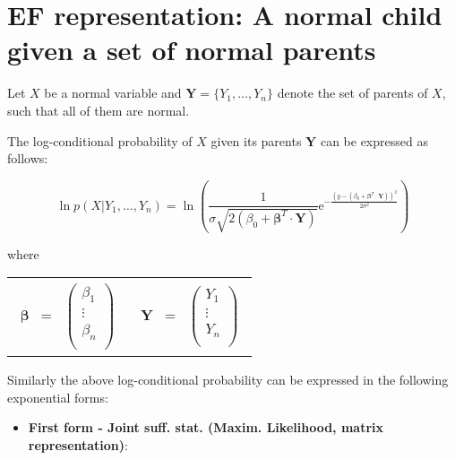 \documentclass[11pt, oneside]{article}   	%
\newcommand{\bm}{\mathbf}
\newcommand{\bs}{\boldsymbol}
\newcommand{\me}{\mathrm{e}}
\numberwithin{figure}{section}
\numberwithin{equation}{section}
\numberwithin{table}{section}
\theoremstyle{definition}
\begin{document}
\begin{appendices}
\begin{itemize}
\end{itemize}


\newpage
\section{EF representation: A normal child given a set of normal parents}

Let $X$ be a normal variable and $ \mathbf{Y} = \{Y_1,\ldots,Y_n\}$ denote the set of parents of $X$, such that all of them are normal. 

The log-conditional probability of $X$ given its parents $\mathbf{Y}$ can be expressed as follows:

$$ \ln p(X|Y_1,\ldots,Y_n) = \ln \left(\frac{1}{\sigma \sqrt{2(\beta_0+ \bs \beta^T \cdot \bm Y )}} \me^{-\frac{(y-(\beta_0+ \bs \beta^T \cdot \bm Y))^2}{2\sigma^2}} \right)$$

where

\begin{tabular}{p{4cm}p{4cm}}
\begin{eqnarray*}
\bs \beta &=& 
\begin{pmatrix}
\beta_1\\
\vdots\\
\beta_n\\
\end{pmatrix}
\end{eqnarray*}
&
\begin{eqnarray*}
\bm Y &=& 
\begin{pmatrix}
Y_1\\
\vdots\\
Y_n\\
\end{pmatrix}
\end{eqnarray*}
\\
\end{tabular}

Similarly the above log-conditional probability can be expressed in the following exponential forms:


\newcommand{\Z}{\bm Z}
\newcommand{\Y}{\bm Y}
\newcommand{\thb}{\bs \theta}
\newcommand{\beb}{\bs \beta}

\begin{itemize}
\item \textbf{First form - Joint suff. stat. (Maxim. Likelihood, matrix representation)}:


\end{itemize}
\end{appendices}
\end{document}
